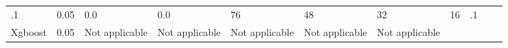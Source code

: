 \documentclass[11pt, a4paper , landscape]{article}
\begin{document}
\begin{longtable}[]{@{}lllllllllll@{}}
\begin{minipage}[t]{0.04\columnwidth}
.1\strut
\end{minipage} & \begin{minipage}[t]{0.05\columnwidth}\raggedright\strut
0.05\strut
\end{minipage} & \begin{minipage}[t]{0.05\columnwidth}\raggedright\strut
0.0\strut
\end{minipage} & \begin{minipage}[t]{0.05\columnwidth}\raggedright\strut
0.0\strut
\end{minipage} & \begin{minipage}[t]{0.09\columnwidth}\raggedright\strut
76\strut
\end{minipage} & \begin{minipage}[t]{0.09\columnwidth}\raggedright\strut
48\strut
\end{minipage} & \begin{minipage}[t]{0.09\columnwidth}\raggedright\strut
32\strut
\end{minipage} & \begin{minipage}[t]{0.10\columnwidth}\raggedright\strut
16\strut
\end{minipage} & \begin{minipage}[t]{0.04\columnwidth}\raggedright\strut
.1\strut
\end{minipage}\tabularnewline
\begin{minipage}[t]{0.04\columnwidth}\raggedright\strut
Xgboost\strut
\end{minipage} & \begin{minipage}[t]{0.09\columnwidth}\raggedright\strut
0.05\strut
\end{minipage} & \begin{minipage}[t]{0.04\columnwidth}\raggedright\strut
Not applicable\strut
\end{minipage} & \begin{minipage}[t]{0.05\columnwidth}\raggedright\strut
Not applicable\strut
\end{minipage} & \begin{minipage}[t]{0.05\columnwidth}\raggedright\strut
Not applicable\strut
\end{minipage} & \begin{minipage}[t]{0.05\columnwidth}\raggedright\strut
Not applicable\strut
\end{minipage} & \begin{minipage}[t]{0.09\columnwidth}\raggedright\strut
Not applicable\strut
\end{minipage} & \begin{minipage}[t]{0.09\columnwidth}\raggedright\strut

\end{minipage}
\end{longtable}
\end{document}
